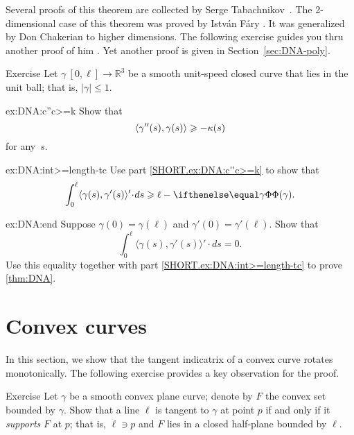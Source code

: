Several proofs of this theorem are collected by Serge Tabachnikov~\cite{tabachnikov}.
The 2-dimensional case of this theorem was proved by Istv\'{a}n F\'{a}ry \cite{fary1950}.
It was generalized by Don Chakerian \cite{chakerian1962} to higher dimensions.
The following exercise guides you thru another proof of him \cite{chakerian1964}.
Yet another proof is given in Section~\ref{sec:DNA-poly}.

\begin{thm}{Exercise}\label{ex:DNA}
Let $\gamma\:[0,\ell]\to\mathbb{R}^3$ be a smooth unit-speed closed curve that lies in the unit ball; that is, $|\gamma|\le 1$.

\begin{subthm}{ex:DNA:c''c>=k}
Show that 
\[\langle\gamma''(s),\gamma(s)\rangle\geqslant-\kappa(s)\]
for any~$s$.
\end{subthm}

\begin{subthm}{ex:DNA:int>=length-tc}
Use part \ref{SHORT.ex:DNA:c''c>=k} to show that 
\[\int_0^\ell\langle\gamma(s),\gamma'(s)\rangle'\cdot ds\ge
\ell-\tc\gamma.\]

\end{subthm}

\begin{subthm}{ex:DNA:end}
Suppose $\gamma(0)=\gamma(\ell)$ and $\gamma'(0)=\gamma'(\ell)$.
Show that 
\[\int_0^\ell\langle\gamma(s),\gamma'(s)\rangle'\cdot ds=0.\]
Use this equality together with  part \ref{SHORT.ex:DNA:int>=length-tc} to prove \ref{thm:DNA}.
\end{subthm}
\end{thm}

\section{Convex curves}

In this section, we show that the tangent indicatrix of a convex curve rotates monotonically. 
The following exercise provides a key observation for the proof.

\begin{thm}{Exercise}\label{ex:tangent-support}
Let $\gamma$ be a smooth convex plane curve;
denote by $F$ the convex set bounded by $\gamma$.
Show that a line $\ell$ is tangent to $\gamma$ at point $p$ if and only if it \emph{supports} $F$ at $p$;
that is, $\ell\ni p$ and $F$ lies in a closed half-plane bounded by $\ell$.
\end{thm}

